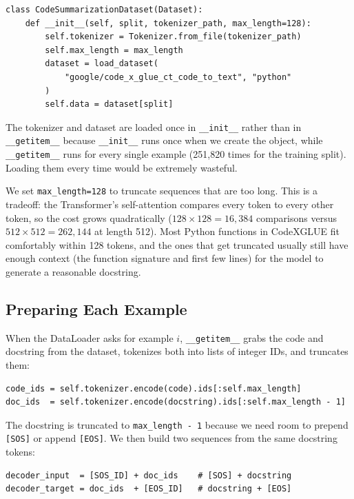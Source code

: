 \documentclass[11pt]{article}
\begin{document}
\begin{lstlisting}[style=python]
class CodeSummarizationDataset(Dataset):
    def __init__(self, split, tokenizer_path, max_length=128):
        self.tokenizer = Tokenizer.from_file(tokenizer_path)
        self.max_length = max_length
        dataset = load_dataset(
            "google/code_x_glue_ct_code_to_text", "python"
        )
        self.data = dataset[split]
\end{lstlisting}

The tokenizer and dataset are loaded once in \texttt{\_\_init\_\_} rather than in \texttt{\_\_getitem\_\_} because \texttt{\_\_init\_\_} runs once when we create the object, while \texttt{\_\_getitem\_\_} runs for every single example (251,820 times for the training split). Loading them every time would be extremely wasteful.

We set \texttt{max\_length=128} to truncate sequences that are too long. This is a tradeoff: the Transformer's self-attention compares every token to every other token, so the cost grows quadratically ($128 \times 128 = 16{,}384$ comparisons versus $512 \times 512 = 262{,}144$ at length 512). Most Python functions in CodeXGLUE fit comfortably within 128 tokens, and the ones that get truncated usually still have enough context (the function signature and first few lines) for the model to generate a reasonable docstring.

\subsection{Preparing Each Example}

When the DataLoader asks for example $i$, \texttt{\_\_getitem\_\_} grabs the code and docstring from the dataset, tokenizes both into lists of integer IDs, and truncates them:

\begin{lstlisting}[style=python]
code_ids = self.tokenizer.encode(code).ids[:self.max_length]
doc_ids  = self.tokenizer.encode(docstring).ids[:self.max_length - 1]
\end{lstlisting}

The docstring is truncated to \texttt{max\_length - 1} because we need room to prepend \texttt{[SOS]} or append \texttt{[EOS]}. We then build two sequences from the same docstring tokens:

\begin{lstlisting}[style=python]
decoder_input  = [SOS_ID] + doc_ids    # [SOS] + docstring
decoder_target = doc_ids  + [EOS_ID]   # docstring + [EOS]
\end{lstlisting}
\end{document}
